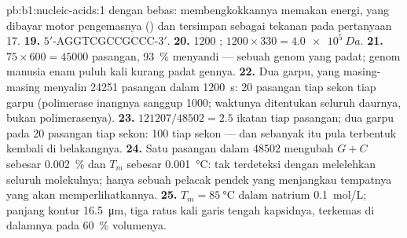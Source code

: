 \begin{solution}{pb:b1:nucleic-acids:1}
dengan bebas: membengkokkannya memakan energi, yang dibayar motor
pengemasnya () dan tersimpan sebagai tekanan pada pertanyaan 17.
\textbf{19.} $5'$-AGGTCGCCGCCC-$3'$.
\textbf{20.} \num{1200} ; $1200\times 330 = \qty{4.0e5}{Da}$.
\textbf{21.} $75\times 600 = \num{45000}$ pasangan, \qty{93}{\%}
menyandi --- sebuah genom yang padat; genom manusia enam puluh kali
kurang padat gennya.
\textbf{22.} Dua garpu, yang masing-masing menyalin \num{24251}
pasangan dalam \qty{1200}{s}: \qty{20}{} pasangan tiap sekon tiap garpu
(polimerase inangnya sanggup \qty{1000}{}; waktunya ditentukan seluruh
daurnya, bukan polimerasenya).
\textbf{23.} $\num{121207}/\num{48502} = 2.5$ ikatan tiap pasangan; dua garpu pada 20 pasangan tiap sekon: 100  tiap sekon --- dan sebanyak itu pula terbentuk kembali di belakangnya.
\textbf{24.} Satu pasangan dalam \num{48502} mengubah $G + C$ sebesar
\qty{0.002}{\%} dan $T_m$ sebesar \qty{0.001}{\celsius}: tak terdeteksi
dengan melelehkan seluruh molekulnya; hanya sebuah pelacak pendek yang
menjangkau tempatnya yang akan memperlihatkannya.
\textbf{25.} $T_m = \qty{85}{\celsius}$ dalam natrium \qty{0.1}{mol/L};
panjang kontur \qty{16.5}{\micro m}, tiga ratus kali garis tengah
kapsidnya, terkemas di dalamnya pada \qty{60}{\%} volumenya.
\end{solution}
